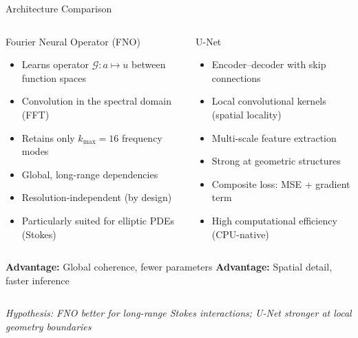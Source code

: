 \documentclass[aspectratio=169, 10pt]{beamer}
\begin{document}
\begin{frame}{Architecture Comparison}
  \begin{columns}[T]
      \begin{block}{\textcolor{fnocolor}{Fourier Neural Operator (FNO)}}
        \begin{itemize}
          \item Learns operator $\mathcal{G}: a \mapsto u$ between function spaces
          \item Convolution in the spectral domain (FFT)
          \item Retains only $k_\text{max} = 16$ frequency modes
          \item Global, long-range dependencies
          \item Resolution-independent (by design)
          \item Particularly suited for elliptic PDEs (Stokes)
        \end{itemize}
      \end{block}

      \begin{block}{\textcolor{unetcolor}{U-Net}}
        \begin{itemize}
          \item Encoder–decoder with skip connections
          \item Local convolutional kernels (spatial locality)
          \item Multi-scale feature extraction
          \item Strong at geometric structures
          \item Composite loss: MSE + gradient term
          \item High computational efficiency (CPU-native)
        \end{itemize}
      \end{block}
  \end{columns}

  \vspace{0.8em}
  \begin{columns}[T]
      \textbf{Advantage:} Global coherence, fewer parameters
      \textbf{Advantage:} Spatial detail, faster inference
  \end{columns}

  \vspace{0.5em}
  \begin{center}
    \small\textit{Hypothesis: FNO better for long-range Stokes interactions;
    U-Net stronger at local geometry boundaries}
  \end{center}
\end{frame}
\end{document}
